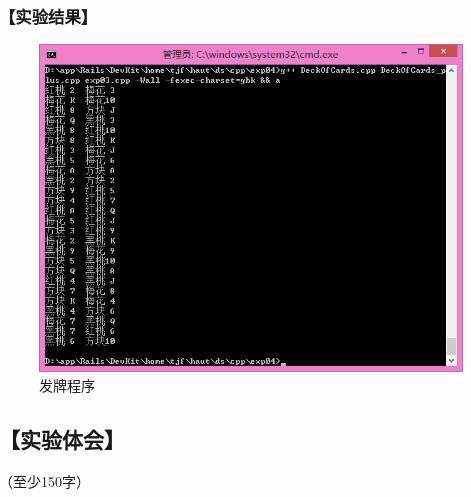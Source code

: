 \subsubsection*{【实验结果】}
\begin{figure}[htp]
\centering
\includegraphics[width=\textwidth]{exp04/exp03.png}
\caption{\label{out04_03}发牌程序}
\end{figure}


\subsection*{【实验体会】}
（至少150字）

